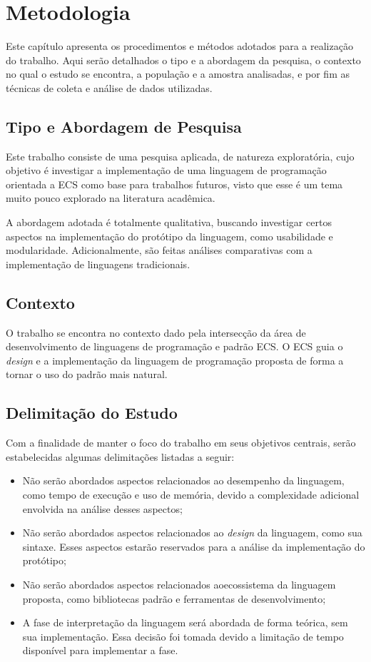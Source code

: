 \chapter{Metodologia}\label{ch:metodologia}

Este capítulo apresenta os procedimentos e métodos adotados para a realização do trabalho. Aqui serão detalhados o tipo e a abordagem da pesquisa, o contexto no qual o estudo se encontra, a população e a amostra analisadas, e por fim as técnicas de coleta e análise de dados utilizadas.

\section{Tipo e Abordagem de Pesquisa}

Este trabalho consiste de uma pesquisa aplicada, de natureza exploratória, cujo objetivo é investigar a implementação de uma linguagem de programação orientada a ECS como base para trabalhos futuros, visto que esse é um tema muito pouco explorado na literatura acadêmica.

A abordagem adotada é totalmente qualitativa, buscando investigar certos aspectos na implementação do protótipo da linguagem, como usabilidade e modularidade. Adicionalmente, são feitas análises comparativas com a implementação de linguagens tradicionais.

\section{Contexto}

O trabalho se encontra no contexto dado pela intersecção da área de desenvolvimento de linguagens de programação e padrão ECS. O ECS guia o \textit{design} e a implementação da linguagem de programação proposta de forma a tornar o uso do padrão mais natural.

\section{Delimitação do Estudo}

Com a finalidade de manter o foco do trabalho em seus objetivos centrais, serão estabelecidas algumas delimitações listadas a seguir:

\begin{itemize}
    \item Não serão abordados aspectos relacionados ao desempenho da linguagem, como tempo de execução e uso de memória, devido a complexidade adicional envolvida na análise desses aspectos;
    \item Não serão abordados aspectos relacionados ao \textit{design} da linguagem, como sua sintaxe. Esses aspectos estarão reservados para a análise da implementação do protótipo;
    \item Não serão abordados aspectos relacionados aoecossistema da linguagem proposta, como bibliotecas padrão e ferramentas de desenvolvimento;
    \item A fase de interpretação da linguagem será abordada de forma teórica, sem sua implementação. Essa decisão foi tomada devido a limitação de tempo disponível para implementar a fase.
\end{itemize}

